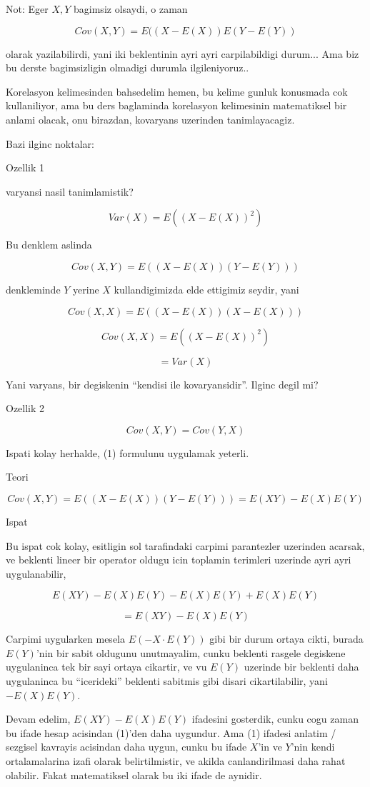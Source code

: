 \documentclass[12pt,fleqn]{article}\usepackage{../common}
\begin{document}
Not: Eger $X,Y$ bagimsiz olsaydi, o zaman 

$$ Cov(X,Y) = E((X-E(X))E(Y-E(Y))  $$

olarak yazilabilirdi, yani iki beklentinin ayri ayri carpilabildigi
durum... Ama biz bu derste bagimsizligin olmadigi durumla ilgileniyoruz..

Korelasyon kelimesinden bahsedelim hemen, bu kelime gunluk konusmada cok
kullaniliyor, ama bu ders baglaminda korelasyon kelimesinin matematiksel
bir anlami olacak, onu birazdan, kovaryans uzerinden tanimlayacagiz.

Bazi ilginc noktalar:

Ozellik 1

varyansi nasil tanimlamistik? 

$$ Var(X) = E((X-E(X))^2)  $$

Bu denklem aslinda 

$$ Cov(X,Y) = E((X-E(X))(Y-E(Y)))  $$

denkleminde $Y$ yerine $X$ kullandigimizda elde ettigimiz seydir, yani

$$ Cov(X,X) = E((X-E(X))(X-E(X)))  $$

$$ Cov(X,X) = E((X-E(X))^2)   $$

$$ = Var(X) $$

Yani varyans, bir degiskenin ``kendisi ile kovaryansidir''. Ilginc degil
mi? 

Ozellik 2

$$ Cov(X,Y) = Cov(Y,X) $$

Ispati kolay herhalde, (1) formulunu uygulamak yeterli.

Teori

$$ Cov(X,Y) = E((X-E(X))(Y-E(Y))) = E(XY) - E(X)E(Y)$$

Ispat

Bu ispat cok kolay, esitligin sol tarafindaki carpimi parantezler uzerinden
acarsak, ve beklenti lineer bir operator oldugu icin toplamin terimleri
uzerinde ayri ayri uygulanabilir, 

$$ E(XY) -E(X)E(Y) -E(X)E(Y) + E(X)E(Y) $$

$$  =  E(XY) - E(X)E(Y) $$

Carpimi uygularken mesela $E(-X \cdot E(Y))$ gibi bir durum ortaya cikti,
burada $E(Y)$'nin bir sabit oldugunu unutmayalim, cunku beklenti rasgele
degiskene uygulaninca tek bir sayi ortaya cikartir, ve vu $E(Y)$ uzerinde
bir beklenti daha uygulaninca bu ``icerideki'' beklenti sabitmis gibi
disari cikartilabilir, yani $-E(X)E(Y)$. 

Devam edelim, $E(XY) - E(X)E(Y)$ ifadesini gosterdik, cunku cogu zaman bu
ifade hesap acisindan (1)'den daha uygundur. Ama (1) ifadesi anlatim /
sezgisel kavrayis acisindan daha uygun, cunku bu ifade $X$'in ve $Y$'nin
kendi ortalamalarina izafi olarak belirtilmistir, ve akilda canlandirilmasi
daha rahat olabilir. Fakat matematiksel olarak bu iki ifade de aynidir. 
\end{document}
